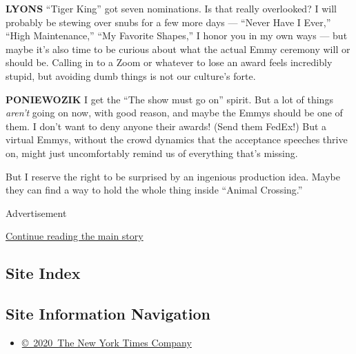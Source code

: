 \textbf{LYONS} ``Tiger King'' got seven nominations. Is that really
overlooked? I will probably be stewing over snubs for a few more days
--- ``Never Have I Ever,'' ``High Maintenance,'' ``My Favorite Shapes,''
I honor you in my own ways --- but maybe it's also time to be curious
about what the actual Emmy ceremony will or should be. Calling in to a
Zoom or whatever to lose an award feels incredibly stupid, but avoiding
dumb things is not our culture's forte.

\textbf{PONIEWOZIK} I get the ``The show must go on'' spirit. But a lot
of things \emph{aren't} going on now, with good reason, and maybe the
Emmys should be one of them. I don't want to deny anyone their awards!
(Send them FedEx!) But a virtual Emmys, without the crowd dynamics that
the acceptance speeches thrive on, might just uncomfortably remind us of
everything that's missing.

But I reserve the right to be surprised by an ingenious production idea.
Maybe they can find a way to hold the whole thing inside ``Animal
Crossing.''

Advertisement

\protect\hyperlink{after-bottom}{Continue reading the main story}

\hypertarget{site-index}{%
\subsection{Site Index}\label{site-index}}

\hypertarget{site-information-navigation}{%
\subsection{Site Information
Navigation}\label{site-information-navigation}}

\begin{itemize}
\tightlist
\item
  \href{https://help.nytimes3xbfgragh.onion/hc/en-us/articles/115014792127-Copyright-notice}{©~2020~The
  New York Times Company}
\end{itemize}

